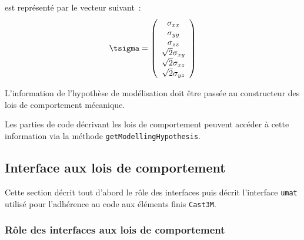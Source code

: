 \documentclass[rectoverso,pleiades,pstricks,leqno,anti]{texmf/note_technique_2010}
\newcommand{\castem}{\texttt{Cast3M}}
\newcommand{\umat}{\texttt{umat}}
\begin{document}
\begin{itemize}
  est représenté par le vecteur suivant~:
  \begin{equation}
    \label{eq:tsigma} \tsigma = \left(
    \begin{array}{c}
      \sigma_{xx} \\
      \sigma_{yy} \\
      \sigma_{zz} \\
      \sqrt{2}\sigma_{xy} \\
      \sqrt{2}\sigma_{xz} \\
      \sqrt{2}\sigma_{yz} \\
    \end{array}
    \right)
  \end{equation}
\end{itemize}

L'information de l'hypothèse de modélisation doit être passée au
constructeur des lois de comportement mécanique.

Les parties de code décrivant les lois de comportement peuvent accéder à
cette information via la méthode {\tt get\-Modelling\-Hypo\-thesis}.

\subsection{Interface aux lois de comportement}

Cette section décrit tout d'abord le rôle des interfaces puis décrit
l'interface \umat{} utilisé pour l'adhérence au code aux éléments finis
\castem{}.

\subsubsection{Rôle des interfaces aux lois de comportement}
\end{document}
